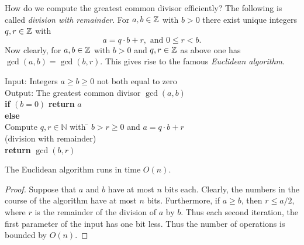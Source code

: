     How do we compute the greatest common divisor efficiently? The
    following is called \emph{division with remainder}.  For
    $a,b \in \mathbb{Z}$
    with $b >0$ there exist unique integers $q,r \in \mathbb{Z}$ with
    \begin{displaymath}
      a = q\cdot b + r, \text{ and }  0\leq r <b. 
    \end{displaymath}
    Now clearly, 
    for $a,b \in \mathbb{Z}$ with $b >0$ and $q,r \in \mathbb{Z}$ as above one has
    $\gcd(a,b) = \gcd(b,r)$.  
  This gives rise to the famous \emph{Euclidean algorithm}. 
  \begin{algorithm}
    \label{alg:1}
    \begin{tabbing}
      Input: Integers $a ≥ b ≥0$ not both equal to zero \\
      Output: The greatest common divisor $\gcd(a,b)$\\
      {\bf if}  $(b=0)$ {\bf return} $a$ \\
      {\bf else} \= \\
      \> Compute $q,r ∈ ℕ$ with \=  $b > r ≥ 0$ and $a = q⋅b +r$ \\
      \> \> (division with remainder)\\
      \> {\bf return} $\gcd(b,r)$ 
    \end{tabbing}
  \end{algorithm}  
%
  \begin{theorem}
    The Euclidean algorithm runs in time $O(n)$. 
  \end{theorem}
  \begin{proof}
    Suppose that $a$ and $b$ have at most $n$ bits each.  Clearly, the
    numbers in the course of the algorithm have at most $n$
    bits. Furthermore, if $a \geq b$, then $r \leq a/2$, where $r$ is
    the remainder of the division of $a$ by $b$. Thus each second
    iteration, the first parameter of the input has one bit less. Thus
    the number of operations is bounded by $O(n)$.
  \end{proof}
  
